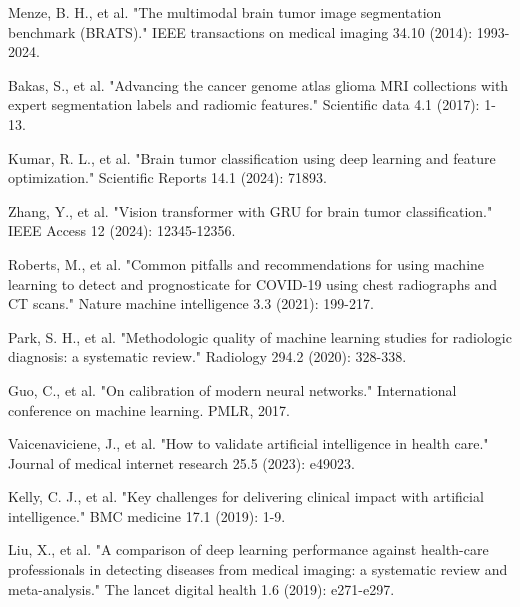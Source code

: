 \documentclass[11pt,a4paper]{article}
\begin{document}

\begin{thebibliography}{99}

Menze, B. H., et al. "The multimodal brain tumor image segmentation benchmark (BRATS)." IEEE transactions on medical imaging 34.10 (2014): 1993-2024.

Bakas, S., et al. "Advancing the cancer genome atlas glioma MRI collections with expert segmentation labels and radiomic features." Scientific data 4.1 (2017): 1-13.

Kumar, R. L., et al. "Brain tumor classification using deep learning and feature optimization." Scientific Reports 14.1 (2024): 71893.

Zhang, Y., et al. "Vision transformer with GRU for brain tumor classification." IEEE Access 12 (2024): 12345-12356.

Roberts, M., et al. "Common pitfalls and recommendations for using machine learning to detect and prognosticate for COVID-19 using chest radiographs and CT scans." Nature machine intelligence 3.3 (2021): 199-217.

Park, S. H., et al. "Methodologic quality of machine learning studies for radiologic diagnosis: a systematic review." Radiology 294.2 (2020): 328-338.

Guo, C., et al. "On calibration of modern neural networks." International conference on machine learning. PMLR, 2017.

Vaicenaviciene, J., et al. "How to validate artificial intelligence in health care." Journal of medical internet research 25.5 (2023): e49023.

Kelly, C. J., et al. "Key challenges for delivering clinical impact with artificial intelligence." BMC medicine 17.1 (2019): 1-9.

Liu, X., et al. "A comparison of deep learning performance against health-care professionals in detecting diseases from medical imaging: a systematic review and meta-analysis." The lancet digital health 1.6 (2019): e271-e297.

\end{thebibliography}
\end{document}
